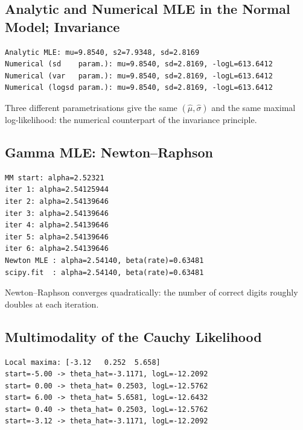 \documentclass[main.tex]{subfiles}
\begin{document}
\subsection{Analytic and Numerical MLE in the Normal Model; Invariance}

\begin{lstlisting}[style=output]
Analytic MLE: mu=9.8540, s2=7.9348, sd=2.8169
Numerical (sd    param.): mu=9.8540, sd=2.8169, -logL=613.6412
Numerical (var   param.): mu=9.8540, sd=2.8169, -logL=613.6412
Numerical (logsd param.): mu=9.8540, sd=2.8169, -logL=613.6412
\end{lstlisting}

Three different parametrisations give the same $(\hat\mu,\hat\sigma)$ and the same maximal log-likelihood: the numerical counterpart of the invariance principle.

\subsection{Gamma MLE: Newton--Raphson}

\begin{lstlisting}[style=output]
MM start: alpha=2.52321
iter 1: alpha=2.54125944
iter 2: alpha=2.54139646
iter 3: alpha=2.54139646
iter 4: alpha=2.54139646
iter 5: alpha=2.54139646
iter 6: alpha=2.54139646
Newton MLE : alpha=2.54140, beta(rate)=0.63481
scipy.fit  : alpha=2.54140, beta(rate)=0.63481
\end{lstlisting}

Newton--Raphson converges quadratically: the number of correct digits roughly doubles at each iteration.

\subsection{Multimodality of the Cauchy Likelihood}

\begin{lstlisting}[style=output]
Local maxima: [-3.12   0.252  5.658]
start=-5.00 -> theta_hat=-3.1171, logL=-12.2092
start= 0.00 -> theta_hat= 0.2503, logL=-12.5762
start= 6.00 -> theta_hat= 5.6581, logL=-12.6432
start= 0.40 -> theta_hat= 0.2503, logL=-12.5762
start=-3.12 -> theta_hat=-3.1171, logL=-12.2092
\end{lstlisting}
\end{document}
